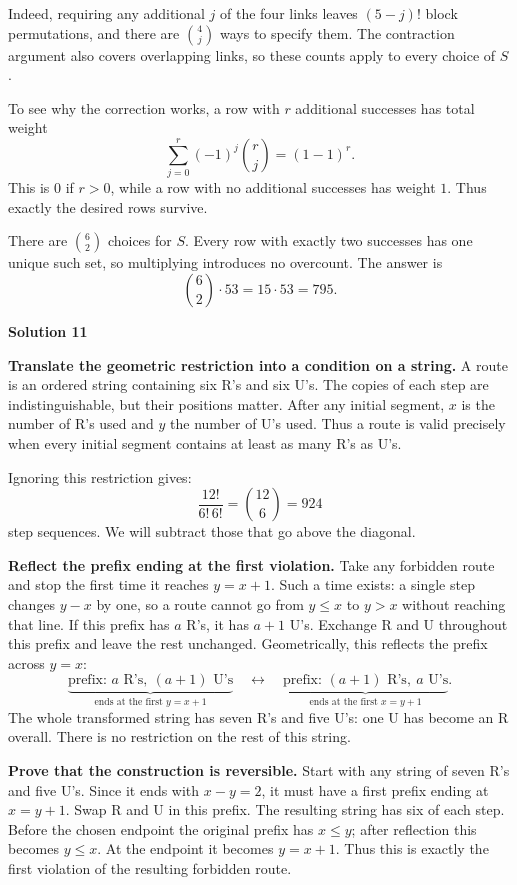 \documentclass[11pt]{article}
\newcommand{\solution}[1]{%
  \par\Needspace{5\baselineskip}\addvspace{.8\baselineskip}%
  {\large\bfseries Solution #1\par}\nopagebreak[4]}
\begin{document}
Indeed, requiring any additional $j$ of the four links leaves
$(5-j)!$ block permutations, and there are $\binom4j$ ways to specify them.
The contraction argument also covers overlapping links, so these counts
apply to every choice of $S$.

To see why the correction works, a row with $r$ additional successes
has total weight
\[
\sum_{j=0}^{r}(-1)^j\binom rj=(1-1)^r.
\]
This is $0$ if $r>0$, while a row with no additional successes has weight
$1$. Thus exactly the desired rows survive.

There are $\binom62$ choices for $S$. Every row with exactly two successes
has one unique such set, so multiplying introduces no overcount. The answer is
\[
\binom62\cdot53=15\cdot53=\boxed{795}.
\]

\solution{11}
\textbf{Translate the geometric restriction into a condition on a string.}
A route is an ordered string containing six R's and six U's. The copies
of each step are indistinguishable, but their positions matter. After
any initial segment, $x$ is the number of R's used and $y$ the number of
U's used. Thus a route is valid precisely when every initial segment
contains at least as many R's as U's.

Ignoring this restriction gives:
\vspace{-8mm}
\[
\frac{12!}{6!\,6!}=\binom{12}{6}=924
\]
step sequences. We will subtract those that go above the diagonal.

\textbf{Reflect the prefix ending at the first violation.}
Take any forbidden route and stop the first time it reaches $y=x+1$.
Such a time exists: a single step changes $y-x$ by one, so a route
cannot go from $y\leq x$ to $y>x$ without reaching that line.
If this prefix has $a$ R's, it has $a+1$ U's.
Exchange R and U throughout this prefix and leave the rest unchanged.
Geometrically, this reflects the prefix across $y=x$:
\[
\underbrace{\text{prefix: }a\text{ R's},\ (a+1)\text{ U's}}_{
\text{ends at the first }y=x+1}
\quad\longleftrightarrow\quad
\underbrace{\text{prefix: }(a+1)\text{ R's},\ a\text{ U's}}_{
\text{ends at the first }x=y+1}.
\]
The whole transformed string has seven R's and five U's: one U has
become an R overall. There is no restriction on the rest of this string.

\textbf{Prove that the construction is reversible.}
Start with any string of seven R's and five U's. Since it ends with
$x-y=2$, it must have a first prefix ending at $x=y+1$.
Swap R and U in this prefix. The resulting string has six of each step.
Before the chosen endpoint the original prefix has $x\leq y$;
after reflection this becomes $y\leq x$. At the endpoint it becomes
$y=x+1$. Thus this is exactly the first violation of the resulting
forbidden route.
\end{document}
